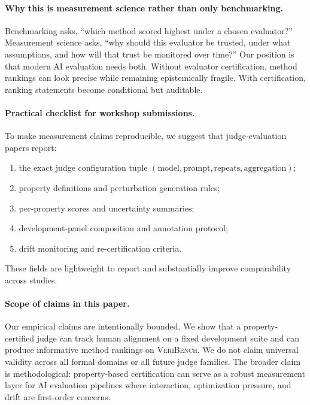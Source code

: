 \paragraph{Why this is measurement science rather than only benchmarking.}
Benchmarking asks, ``which method scored highest under a chosen evaluator?''
Measurement science asks, ``why should this evaluator be trusted, under what assumptions, and how will that trust be monitored over time?''
Our position is that modern AI evaluation needs both.
Without evaluator certification, method rankings can look precise while remaining epistemically fragile.
With certification, ranking statements become conditional but auditable.

\paragraph{Practical checklist for workshop submissions.}
To make measurement claims reproducible, we suggest that judge-evaluation papers report:
\begin{enumerate}
\item the exact judge configuration tuple \((\text{model}, \text{prompt}, \text{repeats}, \text{aggregation})\);
\item property definitions and perturbation generation rules;
\item per-property scores and uncertainty summaries;
\item development-panel composition and annotation protocol;
\item drift monitoring and re-certification criteria.
\end{enumerate}
These fields are lightweight to report and substantially improve comparability across studies.

\paragraph{Scope of claims in this paper.}
Our empirical claims are intentionally bounded.
We show that a property-certified judge can track human alignment on a fixed development suite and can produce informative method rankings on \textsc{VeriBench}.
We do not claim universal validity across all formal domains or all future judge families.
The broader claim is methodological: property-based certification can serve as a robust measurement layer for AI evaluation pipelines where interaction, optimization pressure, and drift are first-order concerns.
